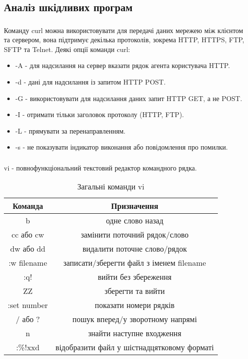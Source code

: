 \documentclass[t]{beamer}  %
\begin{document}
\subsection{Аналіз шкідливих програм}
 
 \begin{frame}
 	\frametitle{\insertsection} 
 	\framesubtitle{\insertsubsection}
Команду curl можна використовувати для передачі даних мережею між клієнтом та сервером, вона підтримує декілька протоколів, зокрема HTTP, HTTPS, FTP, SFTP та Telnet. Деякі опції команди curl:
\begin{itemize}
  \item -A - для надсилання на сервер вказати рядок агента користувача HTTP.
  \item -d - дані для надсилання із запитом HTTP POST.
  \item -G - використовувати для надсилання даних запит HTTP GET, а не POST.
  \item -I - отримати тільки заголовок протоколу (HTTP, FTP).
  \item -L - прямувати за перенаправленням.
  \item -s - не показувати індикатор виконання або повідомлення про помилки.
\end{itemize}

\end{frame}

\begin{frame}
 	\frametitle{\insertsection} 
 	\framesubtitle{\insertsubsection}
vi - повнофункціональний текстовий редактор командного рядка.
\begin{table}
  \caption{Загальні команди vi}
  \label{tab:}

  \begin{center}
    \begin{tabular}{|c|c|}
    \hline
      \textbf{Команда} & \textbf{Призначення}  \\
    \hline
      b & одне слово назад \\
    \hline
      cc або cw & замінити поточний рядок/слово \\
    \hline
      dw або dd & видалити поточне слово/рядок \\
    \hline
      :w filename & записати/зберегти файл з іменем filename \\
    \hline
      :q! & вийти без збереження \\
    \hline
      ZZ & зберегти та вийти \\
    \hline
      :set number & показати номери рядків \\
    \hline
      / або ?  & пошук вперед/у зворотному напрямі \\
    \hline
      n & знайти наступне входження \\
    \hline
      :\%!xxd & відобразити файл у шістнадцятковому форматі \\
    \hline 
    \end{tabular}
  \end{center}
\end{table}
  
\end{frame}
\end{document}
